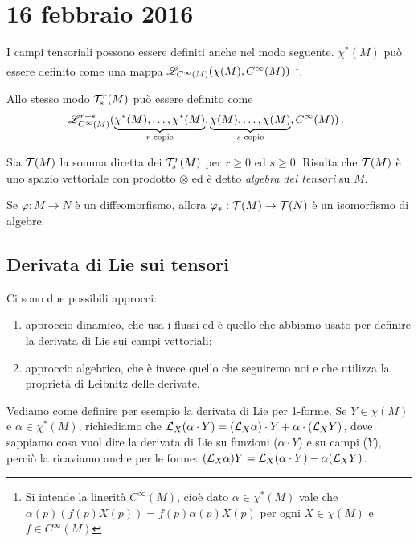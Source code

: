 \chapter{16 febbraio 2016}

\begin{remark} %
	I campi tensoriali possono essere definiti anche nel modo seguente.
	$\chi^*(M)$ può essere definito come una mappa $\mathscr L_{C^\infty(M)} (\chi(M), C^\infty(M))$ \footnote{Si intende la linerità $C^\infty(M)$, cioè dato $\alpha\in\chi^*(M)$ vale che $\alpha(p)(f(p)X(p)) = f(p) \alpha(p) X(p)$ per ogni $X\in\chi(M)$ e $f\in C^\infty(M)$}.
	
	Allo stesso modo $\mathcal T_s^r(M)$ può essere definito come
	\begin{equation*}
	\mathscr L_{C^\infty(M)}^{r+s}(\underbrace{\chi^*(M),\ldots,\chi^*(M)}_{\text{$r$ copie}},\underbrace{\chi(M),\ldots,\chi(M)}_{\text{$s$ copie}},C^\infty(M))\, \text{. }
	\end{equation*}
\end{remark}

\begin{definition} 
	Sia $\mathcal T(M)$ la somma diretta dei $\mathcal T_s^r(M)$ per $r\ge 0$ ed $s\ge 0$. Risulta che $\mathcal T(M)$ è uno spazio vettoriale con prodotto $\otimes$ ed è detto \emph{algebra dei tensori} su $M$.
\end{definition}

Se $\varphi:M\to N$ è un diffeomorfismo, allora $\varphi_*: \mathcal T(M) \to \mathcal T(N)$ è un isomorfismo di algebre.

\section{Derivata di Lie sui tensori}

Ci sono due possibili approcci:
\begin{enumerate}
	\item approccio dinamico, che usa i flussi ed è quello che abbiamo usato per definire la derivata di Lie sui campi vettoriali;
	\item approccio algebrico, che è invece quello che seguiremo noi e che utilizza la proprietà di Leibnitz delle derivate.
\end{enumerate}

\begin{example}
	Vediamo come definire per esempio la derivata di Lie per 1-forme.
	Se $Y\in\chi(M)$ e $\alpha\in\chi^*(M)$, richiediamo che $\mathcal L_X(\alpha \cdot Y) = (\mathcal L_X \alpha)\cdot Y + \alpha \cdot (\mathcal L_X Y)$, dove sappiamo cosa vuol dire la derivata di Lie su funzioni ($\alpha\cdot Y$) e su campi ($Y$), perciò la ricaviamo anche per le forme: $(\mathcal L_X\alpha)Y = \mathcal L_X(\alpha\cdot Y) - \alpha(\mathcal L_XY)$.
\end{example}

